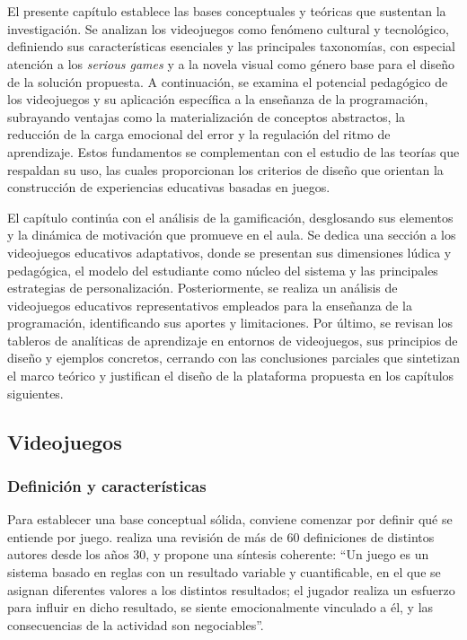 \chapter{\chapterOne}

El presente capítulo establece las bases conceptuales y teóricas que sustentan la investigación. Se analizan los videojuegos como fenómeno cultural y tecnológico, definiendo sus características esenciales y las principales taxonomías, con especial atención a los \textit{serious games} y a la novela visual como género base para el diseño de la solución propuesta. A continuación, se examina el potencial pedagógico de los videojuegos y su aplicación específica a la enseñanza de la programación, subrayando ventajas como la materialización de conceptos abstractos, la reducción de la carga emocional del error y la regulación del ritmo de aprendizaje. Estos fundamentos se complementan con el estudio de las teorías que respaldan su uso, las cuales proporcionan los criterios de diseño que orientan la construcción de experiencias educativas basadas en juegos.

El capítulo continúa con el análisis de la gamificación, desglosando sus elementos y la dinámica de motivación que promueve en el aula. Se dedica una sección a los videojuegos educativos adaptativos, donde se presentan sus dimensiones lúdica y pedagógica, el modelo del estudiante como núcleo del sistema y las principales estrategias de personalización. Posteriormente, se realiza un análisis de videojuegos educativos representativos empleados para la enseñanza de la programación, identificando sus aportes y limitaciones. Por último, se revisan los tableros de analíticas de aprendizaje en entornos de videojuegos, sus principios de diseño y ejemplos concretos, cerrando con las conclusiones parciales que sintetizan el marco teórico y justifican el diseño de la plataforma propuesta en los capítulos siguientes.

\section{Videojuegos}
\subsection{Definición y características}


Para establecer una base conceptual sólida, conviene comenzar por definir qué se entiende por juego. \textcite{stenros_game_2017} realiza una revisión de más de 60 definiciones de distintos autores desde los años 30, y propone una síntesis coherente: “Un juego es un sistema basado en reglas con un resultado variable y cuantificable, en el que se asignan diferentes valores a los distintos resultados; el jugador realiza un esfuerzo para influir en dicho resultado, se siente emocionalmente vinculado a él, y las consecuencias de la actividad son negociables”.

